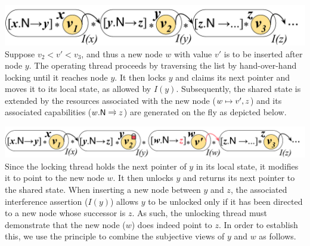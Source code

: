 %
{\centering \includegraphics[scale=0.25]{Sections/Examples/Images/coloslSet.pdf}\\}
%
\noindent Suppose $v_2 < v' < v_3$, and thus a new node $w$ with value $v'$ is to be inserted after node $y$.  The operating thread proceeds by traversing the list by hand-over-hand locking until it reaches node $y$. It then locks $y$ and claims its next pointer and moves it to its local state, as allowed by $I(y)$. Subsequently, the shared state is {extended} by the resources associated with the new node ($w \mapsto v', z$) and its associated capabilities ($\nextC{w}{z}$) are generated on the fly as depicted below.

%
{\centering \includegraphics[scale=0.25]{Sections/Examples/Images/add1.pdf}\\}
%
\noindent Since the locking thread holds the next pointer of $y$ in its local state, it modifies it to point to the new node $w$. It then unlocks $y$ and returns its next pointer to the shared state. When inserting a new node between $y$ and $z$, the associated interference assertion ($I(y)$) allows $y$ to be unlocked only if it has been directed to a new node whose successor is $z$. As such, the unlocking thread must demonstrate that the new node ($w$) does indeed point to $z$. In order to establish this, we use the \mergeRule principle to combine the subjective views of $y$ and $w$ as follows.

